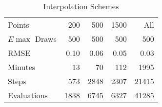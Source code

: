 \begin{table}\onehalfspacing
\begin{center}
\begin{threeparttable}
  \captionsetup{width=30cm}
  \caption{Interpolation Schemes}
  \label{Interpolation Schemes}
  \begin{tabular}{lrrrr}\toprule
  Points      & 200 & 500 & 1500  & All \\
  $E\max$ Draws & 500 &  500 &   500 & 500 \\
  \midrule
  RMSE        & 0.10 &   0.06 &    0.05 &  0.03  \\
  Minutes     &  13 &      70 &    112 &   1995 \\
  Steps       &  573 &   2848 &    2307 &  21415 \\
  Evaluations & 1838 &   6745 &    6327 &  41285 \\
  \bottomrule
  \end{tabular}
  \end{threeparttable}
  \end{center}
\end{table}
